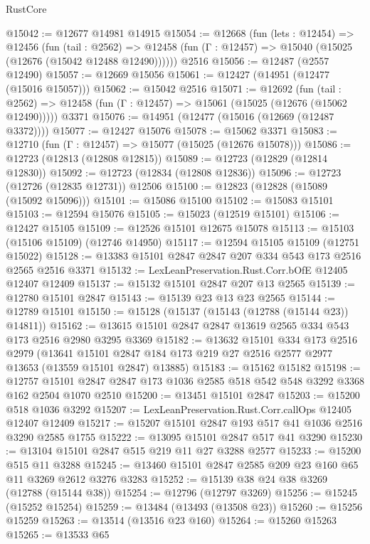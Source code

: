 \begin{lexlean}{RustCore}
\begin{coremodule}
@15042 := @12677 @14981 @14915
@15054 := @12668
    (fun (lets : @12454) =>
    @12456
      (fun (tail : @2562) =>
      @12458 (fun (Γ : @12457) => @15040 (@15025 (@12676 (@15042 @12488 @12490))))))
    @2516
@15056 := @12487 (@2557 @12490)
@15057 := @12669 @15056
@15061 := @12427 (@14951 (@12477 (@15016 @15057)))
@15062 := @15042 @2516
@15071 := @12692
    (fun (tail : @2562) => @12458 (fun (Γ : @12457) => @15061 (@15025 (@12676 (@15062 @12490)))))
    @3371
@15076 := @14951 (@12477 (@15016 (@12669 (@12487 @3372))))
@15077 := @12427 @15076
@15078 := @15062 @3371
@15083 := @12710 (fun (Γ : @12457) => @15077 (@15025 (@12676 @15078)))
@15086 := @12723 (@12813 (@12808 @12815))
@15089 := @12723 (@12829 (@12814 @12830))
@15092 := @12723 (@12834 (@12808 @12836))
@15096 := @12723 (@12726 (@12835 @12731)) @12506
@15100 := @12823 (@12828 (@15089 (@15092 @15096)))
@15101 := @15086 @15100
@15102 := @15083 @15101
@15103 := @12594 @15076
@15105 := @15023 (@12519 @15101)
@15106 := @12427 @15105
@15109 := @12526 @15101 @12675 @15078
@15113 := @15103 (@15106 @15109) (@12746 @14950)
@15117 := @12594 @15105 @15109 (@12751 @15022)
@15128 := @13383 @15101 @2847 @2847 @207 @334 @543 @173 @2516 @2565 @2516 @3371
@15132 := LexLeanPreservation.Rust.Corr.bOfE @12405 @12407 @12409
@15137 := @15132 @15101 @2847 @207 @13 @2565
@15139 := @12780 @15101 @2847
@15143 := @15139 @23 @13 @23 @2565
@15144 := @12789 @15101
@15150 := @15128 (@15137 (@15143 (@12788 (@15144 @23)) @14811))
@15162 := @13615 @15101 @2847 @2847 @13619 @2565 @334 @543 @173 @2516 @2980 @3295 @3369
@15182 := @13632
    @15101
    @334
    @173
    @2516
    @2979
    (@13641 @15101 @2847 @184 @173 @219 @27 @2516 @2577 @2977 @13653 (@13559 @15101 @2847) @13885)
@15183 := @15162 @15182
@15198 := @12757
    @15101
    @2847
    @2847
    @173
    @1036
    @2585
    @518
    @542
    @548
    @3292
    @3368
    @162
    @2504
    @1070
    @2510
@15200 := @13451 @15101 @2847
@15203 := @15200 @518 @1036 @3292
@15207 := LexLeanPreservation.Rust.Corr.callOps @12405 @12407 @12409
@15217 := @15207 @15101 @2847 @193 @517 @41 @1036 @2516 @3290 @2585 @1755
@15222 := @13095 @15101 @2847 @517 @41 @3290
@15230 := @13104 @15101 @2847 @515 @219 @11 @27 @3288 @2577
@15233 := @15200 @515 @11 @3288
@15245 := @13460 @15101 @2847 @2585 @209 @23 @160 @65 @11 @3269 @2612 @3276 @3283
@15252 := @15139 @38 @24 @38 @3269 (@12788 (@15144 @38))
@15254 := @12796 (@12797 @3269)
@15256 := @15245 (@15252 @15254)
@15259 := @13484 (@13493 (@13508 @23))
@15260 := @15256 @15259
@15263 := @13514 (@13516 @23 @160)
@15264 := @15260 @15263
@15265 := @13533 @65

\end{coremodule}
\end{lexlean}
